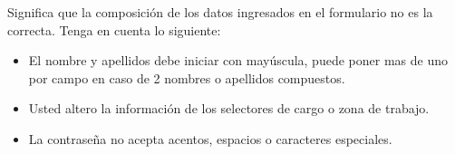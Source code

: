 \begin{itemize}
\begin{figure}[!hbtp]
                         \end{figure}
                         
                            
                            Significa que la composición de los datos ingresados en el formulario no es la correcta. Tenga en cuenta lo siguiente:
                            
                            \begin{itemize}
                            	\item El nombre y apellidos debe iniciar con mayúscula, puede poner mas de uno por campo en caso de 2 nombres o apellidos compuestos.
                            	\item Usted altero la información de los selectores de cargo o zona de trabajo.
                            	\item La contraseña no acepta acentos, espacios o caracteres especiales.
                            \end{itemize}
                        
                        
                    
                    \end{itemize}